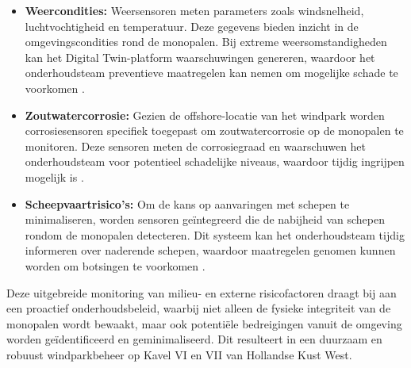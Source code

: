 \begin{itemize}
    \item \textbf{Weercondities:} Weersensoren meten parameters zoals windsnelheid, luchtvochtigheid en temperatuur. Deze gegevens bieden inzicht in de omgevingscondities rond de monopalen. Bij extreme weersomstandigheden kan het Digital Twin-platform waarschuwingen genereren, waardoor het onderhoudsteam preventieve maatregelen kan nemen om mogelijke schade te voorkomen \cite{9738001}.
    \item \textbf{Zoutwatercorrosie:} Gezien de offshore-locatie van het windpark worden corrosiesensoren specifiek toegepast om zoutwatercorrosie op de monopalen te monitoren. Deze sensoren meten de corrosiegraad en waarschuwen het onderhoudsteam voor potentieel schadelijke niveaus, waardoor tijdig ingrijpen mogelijk is \cite{9738001}.
    \item \textbf{Scheepvaartrisico's:} Om de kans op aanvaringen met schepen te minimaliseren, worden sensoren geïntegreerd die de nabijheid van schepen rondom de monopalen detecteren. Dit systeem kan het onderhoudsteam tijdig informeren over naderende schepen, waardoor maatregelen genomen kunnen worden om botsingen te voorkomen \cite{9738001}.
\end{itemize}

Deze uitgebreide monitoring van milieu- en externe risicofactoren draagt bij aan een proactief onderhoudsbeleid, waarbij niet alleen de fysieke integriteit van de monopalen wordt bewaakt, maar ook potentiële bedreigingen vanuit de omgeving worden geïdentificeerd en geminimaliseerd. Dit resulteert in een duurzaam en robuust windparkbeheer op Kavel VI en VII van Hollandse Kust West.
